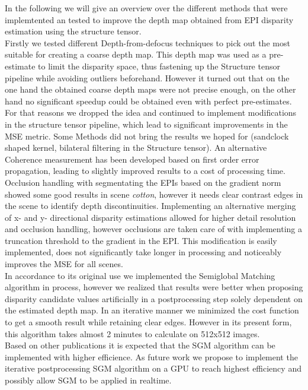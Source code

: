 \documentclass  [
  paper    = a4,
  BCOR     = 10mm,
  twoside,
  fontsize = 12pt,
  fleqn,
  toc      = bibnumbered,
  toc      = listofnumbered,
  numbers  = noendperiod,
  headings = normal,
  listof   = leveldown,
  version  = 3.03
]                                       {scrreprt}
\begin{document}
In the following we will give an overview over the different methods that were implemtented an tested to improve the depth map obtained from EPI disparity estimation using the structure tensor.\\
Firstly we tested different Depth-from-defocus techniques to pick out the most suitable for creating a coarse depth map. This depth map was used as a pre-estimate to limit the disparity space, thus fastening up the Structure tensor pipeline while avoiding outliers beforehand. However it turned out that on the one hand the obtained coarse depth maps were not precise enough, on the other hand no significant speedup could be obtained even with perfect pre-estimates. For that reasons we dropped the idea and continued to implement modifications in the structure tensor pipeline, which lead to significant improvements in the MSE metric. Some Methods did not bring the results we hoped for (sandclock shaped kernel, bilateral filtering in the Structure tensor).
An alternative Coherence measurement has been developed based on first order error propagation, leading to slightly improved results to a cost of processing time. Occlusion handling with segmentating the EPIs based on the gradient norm showed some good results in scene \textit{cotton}, however it needs clear contrast edges in the scene to identify depth discontinuities. Implementing an alternative merging of x- and y- directional disparity estimations allowed for higher detail resolution and occlusion handling, however occlusions are taken care of with implementing a truncation threshold to the gradient in the EPI. This modification is easily implemented, does not significantly take longer in processing and noticeably improves the MSE for all scenes. \\
In accordance to its original use we implemented the Semiglobal Matching algorithm in process, however we realized that results were better when proposing disparity candidate values artificially in a postprocessing step solely dependent on the estimated depth map. In an iterative manner we minimized the cost function to get a smooth result while retaining clear edges. However in its present form, this algorithm takes almost 2 minutes to calculate on 512x512 images.
\\
Based on other publications it is expected that the SGM algorithm can be implemented with higher efficience. As future work we propose to implement the iterative postprocessing SGM algorithm on a GPU to reach highest efficiency and possibly allow SGM to be applied in realtime.\\
\end{document}
